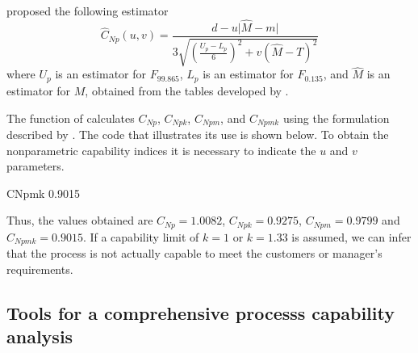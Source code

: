 \citet{pearn1997practical} proposed the following estimator
$$ \hat{C}_{Np}\left( u,v\right)= \frac{d-u\vert \hat{M} - m\vert}{3\sqrt{\left(\frac{U_p-L_p}{6} \right)^2+v\left( \hat{M} - T\right)^2}}$$
where $U_p$ is an estimator for $F_{99.865}$, $L_p$ is an estimator for $F_{0.135}$, and $\hat{M}$ is an estimator for $M$, obtained from the tables developed by \cite{gruska1989non}. 

The  function of  calculates $C_{Np}$, $C_{Npk}$, $C_{Npm}$, and $C_{Npmk}$ using the formulation described by \citet{tong1998lower}. 
The code that illustrates its use is shown below. 
To obtain the nonparametric capability indices it is necessary to indicate the $u$ and $v$ parameters.
\begin{example}
 CNpmk 
0.9015 
\end{example}
Thus, the values obtained are $C_{Np}=1.0082$, $C_{Npk}=0.9275$, $C_{Npm}=0.9799$ and $C_{Npmk}=0.9015$. 
If a capability limit of $k=1$ or $k=1.33$ is assumed, we can infer that the process is not actually capable to meet the customers or 
manager's requirements.

\subsection{Tools for a comprehensive processs capability analysis}

